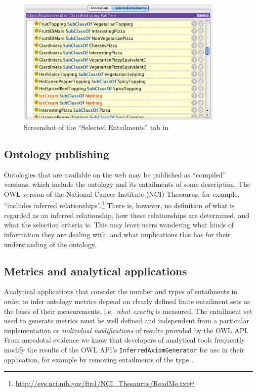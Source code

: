 \begin{figure}
\centering
\includegraphics[width=0.9\textwidth]{img/entailment-tab.pdf}
\caption{Screenshot of the \enquote{Selected Entailments} tab in \protege}
\label{fig:selected-entaiments-tab}
\end{figure}


\subsection{Ontology publishing}

Ontologies that are available on the web may be published as \enquote{compiled} versions, which include the ontology and its entailments of some description. The OWL version of the National Cancer Institute (NCI) Thesaurus, for example, \enquote{includes inferred relationships}.\footnote{\url{http://evs.nci.nih.gov/ftp1/NCI\_Thesaurus/ReadMe.txt}} There is, however, no definition of what is regarded as an inferred relationship, how these relationships are determined, and what the selection criteria is. This may leave users wondering what kinds of information they are dealing with, and what implications this has for their understanding of the ontology. 

\subsection{Metrics and analytical applications}
Analytical applications that consider the number and types of entailments in order to infer ontology metrics depend on clearly defined finite entailment sets as the basis of their  measurements, i.e.\ \emph{what exactly} is measured. The entailment set used to generate metrics must be well defined and independent from a particular implementation or \emph{individual modifications} of results provided by the OWL API. From anecdotal evidence we know that developers of analytical tools frequently modify the results of the OWL API's \texttt{InferredAxiomGenerator} for use in their application, for example by removing entailments of the type . 

